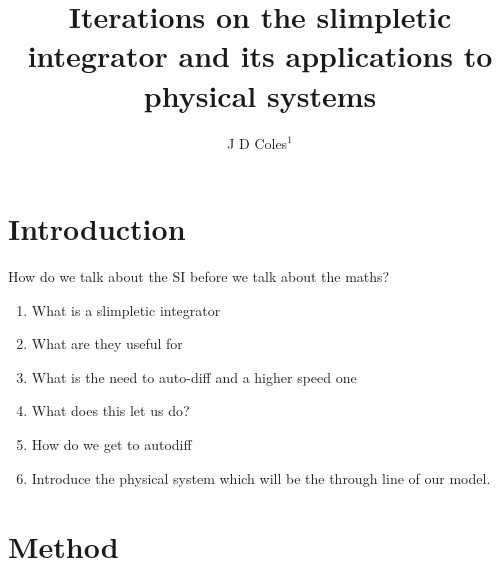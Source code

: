 \documentclass[10pt]{iopart}
\begin{document}
	\title{Iterations on the slimpletic integrator and its applications to physical systems}
	\author{J D Coles$^1$}
	\address{$^1$ Department of Physics, University of Bath, Claverton Down, Bath BA2 7AY, UK}
\begin{abstract}
\lipsum[1]
\end{abstract}
\maketitle
\ioptwocol

\section{Introduction}

How do we talk about the SI before we talk about the maths?
\begin{enumerate}
	\item What is a slimpletic integrator
	\item What are they useful for
	\item What is the need to auto-diff and a higher speed one
	\item What \PHYSICS does this let us do?
	\item How do we get to autodiff
	\item Introduce the physical system which will be the through line of our model.
\end{enumerate}

\cite{tsangSLIMPLECTICINTEGRATORSVARIATIONAL2015}



\section{Method}
\end{document}
